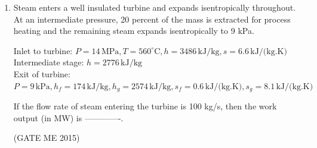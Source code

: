 \documentclass[journal]{IEEEtran}
\begin{document}
\begin{enumerate}
\item Steam enters a well insulated turbine and expands isentropically throughout. At an intermediate pressure, 20 percent of the mass is extracted for process heating and the remaining steam expands isentropically to 9 kPa.

Inlet to turbine: $P = 14 \, \text{MPa}, T = 560^\circ\text{C}, h = 3486 \, \text{kJ/kg}, s = 6.6 \, \text{kJ/(kg.K)}$ \\
Intermediate stage: $h = 2776 \, \text{kJ/kg}$ \\
Exit of turbine: $P = 9 \, \text{kPa}, h_f = 174 \, \text{kJ/kg}, h_g = 2574 \, \text{kJ/kg}, s_f = 0.6 \, \text{kJ/(kg.K)}, s_g = 8.1 \, \text{kJ/(kg.K)}$

If the flow rate of steam entering the turbine is 100 kg/s, then the work output (in MW) is -------------.

\hfill  (GATE ME 2015)


\end{enumerate}
\end{document}
